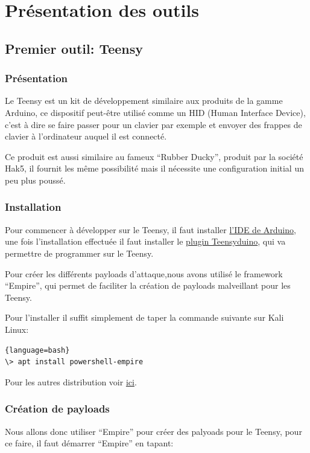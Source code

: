 \section{Présentation des outils}

\subsection{Premier outil: Teensy}

\subsubsection{Présentation}

Le Teensy est un kit de développement similaire aux produits de la gamme Arduino, 
ce dispositif peut-être utilisé comme un HID (Human Interface Device), 
c’est à dire se faire passer pour un clavier par exemple et envoyer des frappes de clavier à l’ordinateur 
auquel il est connecté.

Ce produit est aussi similaire au fameux “Rubber Ducky”, produit par la société Hak5, 
il fournit les même possibilité mais il nécessite une configuration initial un peu plus poussé.

\subsubsection{Installation}
Pour commencer à développer sur le Teensy, il faut installer \href{https://www.arduino.cc/en/main/software}{l’IDE de Arduino}, 
une fois l’installation effectuée il faut installer le \href{https://www.pjrc.com/teensy/teensyduino.html}{plugin Teensyduino}, qui va permettre de programmer sur le Teensy.

Pour créer les différents payloads d’attaque,nous avons utilisé le framework “Empire”, qui permet de faciliter 
la création de payloads malveillant pour les Teensy.

Pour l’installer il suffit simplement de taper la commande suivante sur Kali Linux:

\begin{lstlisting}{language=bash}
\> apt install powershell-empire
\end{lstlisting}

Pour les autres distribution voir \href{https://github.com/BC-SECURITY/Empire/tree/dev}{ici}. 

\subsubsection{Création de payloads}
Nous allons donc utiliser “Empire” pour créer des palyoads pour le Teensy, pour ce faire, il faut démarrer “Empire” en tapant: 


